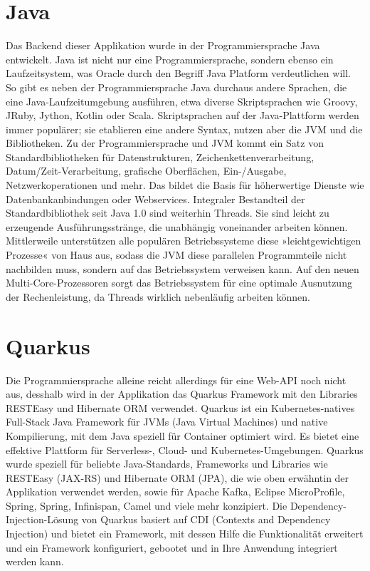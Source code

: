 \section{Java}

Das Backend dieser Applikation wurde in der Programmiersprache Java entwickelt.
Java ist nicht nur eine Programmiersprache, sondern ebenso ein Laufzeitsystem, was Oracle durch den Begriff Java Platform verdeutlichen will. 
So gibt es neben der Programmiersprache Java durchaus andere Sprachen, die eine Java-Laufzeitumgebung ausführen, etwa diverse Skriptsprachen wie 
Groovy, JRuby, Jython, Kotlin oder Scala. Skriptsprachen auf der Java-Plattform werden immer populärer; sie etablieren eine andere Syntax, nutzen aber die JVM und die Bibliotheken.
Zu der Programmiersprache und JVM kommt ein Satz von Standardbibliotheken für Datenstrukturen, Zeichenkettenverarbeitung, Datum/Zeit-Verarbeitung, grafische Oberflächen, 
Ein-/Ausgabe, Netzwerkoperationen und mehr. Das bildet die Basis für höherwertige Dienste wie Datenbankanbindungen oder Webservices. Integraler Bestandteil der Standardbibliothek 
seit Java 1.0 sind weiterhin Threads. Sie sind leicht zu erzeugende Ausführungsstränge, die unabhängig voneinander arbeiten können. 
Mittlerweile unterstützen alle populären Betriebssysteme diese »leichtgewichtigen Prozesse« von Haus aus, sodass die JVM diese parallelen Programmteile nicht nachbilden muss, 
sondern auf das Betriebssystem verweisen kann. Auf den neuen Multi-Core-Prozessoren sorgt das Betriebssystem für eine optimale Ausnutzung der Rechenleistung, da Threads wirklich nebenläufig arbeiten können.
\cite{sysarch-java-1}

\section{Quarkus}

Die Programmiersprache alleine reicht allerdings für eine Web-API noch nicht aus, desshalb wird in der Applikation das Quarkus Framework mit den Libraries RESTEasy und Hibernate ORM verwendet.
Quarkus ist ein Kubernetes-natives Full-Stack Java Framework für JVMs (Java Virtual Machines) und native Kompilierung, mit dem Java speziell für Container optimiert wird. 
Es bietet eine effektive Plattform für Serverless-, Cloud- und Kubernetes-Umgebungen. Quarkus wurde speziell für 
beliebte Java-Standards, Frameworks und Libraries wie RESTEasy (JAX-RS) und Hibernate ORM (JPA), die wie oben erwähntin der Applikation verwendet werden, 
sowie für Apache Kafka, Eclipse MicroProfile, Spring, Spring, Infinispan, Camel und viele mehr konzipiert.
Die Dependency-Injection-Lösung von Quarkus basiert auf CDI (Contexts and Dependency Injection) und bietet ein Framework, mit dessen Hilfe die Funktionalität 
erweitert und ein Framework konfiguriert, gebootet und in Ihre Anwendung integriert werden kann. 


